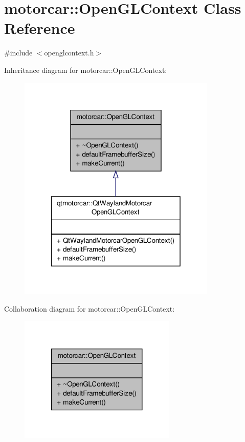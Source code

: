 \hypertarget{classmotorcar_1_1OpenGLContext}{\section{motorcar\-:\-:Open\-G\-L\-Context Class Reference}
\label{classmotorcar_1_1OpenGLContext}
}


{\ttfamily \#include $<$openglcontext.\-h$>$}



Inheritance diagram for motorcar\-:\-:Open\-G\-L\-Context\-:
\nopagebreak
\begin{figure}[H]
\begin{center}
\leavevmode
\includegraphics[width=268pt]{classmotorcar_1_1OpenGLContext__inherit__graph}
\end{center}
\end{figure}


Collaboration diagram for motorcar\-:\-:Open\-G\-L\-Context\-:
\nopagebreak
\begin{figure}[H]
\begin{center}
\leavevmode
\includegraphics[width=212pt]{classmotorcar_1_1OpenGLContext__coll__graph}
\end{center}
\end{figure}
